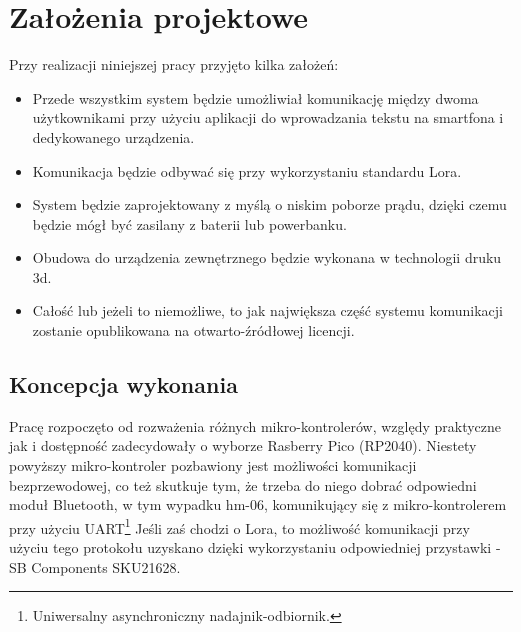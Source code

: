 \newpage %
\section{Założenia projektowe}
Przy realizacji niniejszej pracy przyjęto kilka założeń:
\begin{itemize}
	\item Przede wszystkim system będzie umożliwiał komunikację między dwoma użytkownikami przy użyciu aplikacji do wprowadzania tekstu na smartfona i dedykowanego urządzenia.
	\item Komunikacja będzie odbywać się przy wykorzystaniu standardu Lora.
	\item System będzie zaprojektowany z myślą o niskim poborze prądu, dzięki czemu będzie mógł być zasilany z baterii lub powerbanku.
	\item Obudowa do urządzenia zewnętrznego będzie wykonana w technologii druku 3d.
	\item Całość lub jeżeli to niemożliwe, to jak największa część systemu komunikacji zostanie opublikowana na otwarto-źródłowej licencji.
\end{itemize}
\subsection{Koncepcja wykonania}
Pracę rozpoczęto od rozważenia różnych mikro-kontrolerów, względy praktyczne jak i dostępność zadecydowały o wyborze Rasberry Pico (RP2040). Niestety powyższy mikro-kontroler pozbawiony jest możliwości komunikacji bezprzewodowej, co też skutkuje tym, że trzeba do niego dobrać odpowiedni moduł Bluetooth, w tym wypadku hm-06, komunikujący się z mikro-kontrolerem przy użyciu UART\footnote{Uniwersalny asynchroniczny nadajnik-odbiornik.}
Jeśli zaś chodzi o Lora, to możliwość komunikacji przy użyciu tego protokołu uzyskano dzięki wykorzystaniu odpowiedniej przystawki - SB Components SKU21628.
